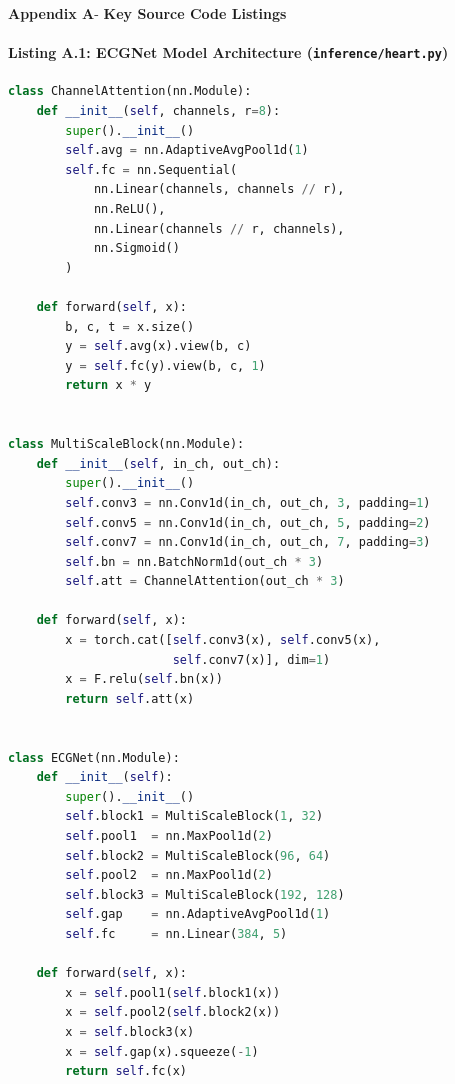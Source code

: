 \begin{center}
	{\Large \textbf{Appendix A}}-\vspace*{0.5 cm}
	{\Large \textbf{Key Source Code Listings}}
	
\end{center}

\paragraph{Listing A.1: ECGNet Model Architecture (\texttt{inference/heart.py})}
\begin{lstlisting}[language=Python, caption={ECGNet Multi-Scale Attention CNN Architecture}]
class ChannelAttention(nn.Module):
    def __init__(self, channels, r=8):
        super().__init__()
        self.avg = nn.AdaptiveAvgPool1d(1)
        self.fc = nn.Sequential(
            nn.Linear(channels, channels // r),
            nn.ReLU(),
            nn.Linear(channels // r, channels),
            nn.Sigmoid()
        )

    def forward(self, x):
        b, c, t = x.size()
        y = self.avg(x).view(b, c)
        y = self.fc(y).view(b, c, 1)
        return x * y


class MultiScaleBlock(nn.Module):
    def __init__(self, in_ch, out_ch):
        super().__init__()
        self.conv3 = nn.Conv1d(in_ch, out_ch, 3, padding=1)
        self.conv5 = nn.Conv1d(in_ch, out_ch, 5, padding=2)
        self.conv7 = nn.Conv1d(in_ch, out_ch, 7, padding=3)
        self.bn = nn.BatchNorm1d(out_ch * 3)
        self.att = ChannelAttention(out_ch * 3)

    def forward(self, x):
        x = torch.cat([self.conv3(x), self.conv5(x),
                       self.conv7(x)], dim=1)
        x = F.relu(self.bn(x))
        return self.att(x)


class ECGNet(nn.Module):
    def __init__(self):
        super().__init__()
        self.block1 = MultiScaleBlock(1, 32)
        self.pool1  = nn.MaxPool1d(2)
        self.block2 = MultiScaleBlock(96, 64)
        self.pool2  = nn.MaxPool1d(2)
        self.block3 = MultiScaleBlock(192, 128)
        self.gap    = nn.AdaptiveAvgPool1d(1)
        self.fc     = nn.Linear(384, 5)

    def forward(self, x):
        x = self.pool1(self.block1(x))
        x = self.pool2(self.block2(x))
        x = self.block3(x)
        x = self.gap(x).squeeze(-1)
        return self.fc(x)
\end{lstlisting}


